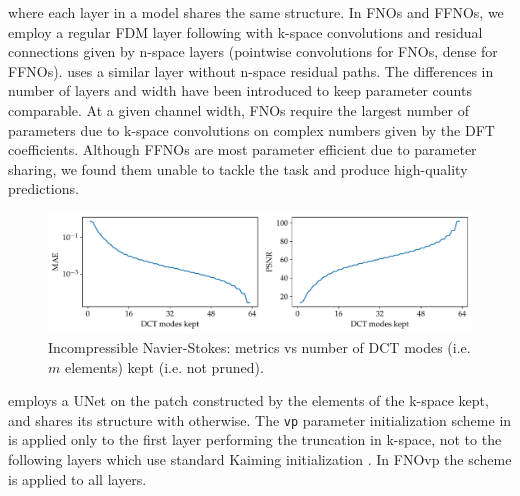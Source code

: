 where each layer in a model shares the same structure. In FNOs and FFNOs, we employ a regular FDM layer following \citep{li2020fourier,tran2021factorized} with k-space convolutions and residual connections given by n-space layers (pointwise convolutions for FNOs, dense for FFNOs). \ourmethod{} uses a similar layer without n-space residual paths. The differences in number of layers and width have been introduced to keep parameter counts comparable. At a given channel width, FNOs require the largest number of parameters due to k-space convolutions on complex numbers given by the DFT coefficients. Although FFNOs \citep{tran2021factorized} are most parameter efficient due to parameter sharing, we found them unable to tackle the task and produce high-quality predictions.  

\begin{figure}[h!]
    \centering
    \includegraphics[width=0.8\linewidth]{figures/navier_stokes_error_vs_dct_modes.pdf}
    \vspace{-3mm}
    \caption{\small Incompressible Navier-Stokes: metrics vs number of DCT modes (i.e. $m$ elements) kept (i.e. not pruned).}
    \label{fig:navier-stokes-modes-mae-psnr}
\end{figure}



\ourmethod{+} employs a UNet on the patch constructed by the elements of the k-space kept, and shares its structure with \ourmethod{} otherwise. The {\tt vp} parameter initialization scheme in \ourmethod{} is applied only to the first layer performing the truncation in k-space, not to the following layers which use standard Kaiming initialization \cite{he2015delving}. In FNOvp the scheme is applied to all layers.


